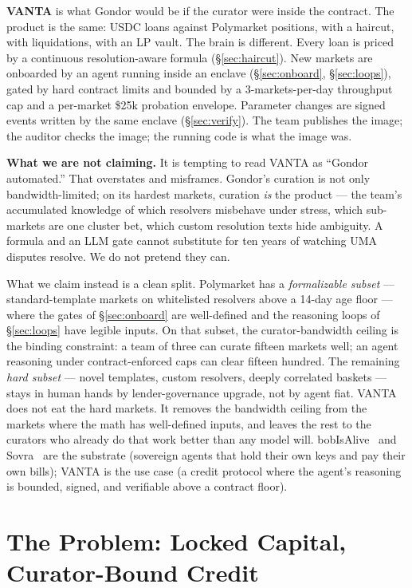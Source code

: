 \documentclass[11pt,letterpaper]{article}
\begin{document}
\textbf{VANTA} is what Gondor would be if the curator were inside the contract. The product is the same: USDC loans against Polymarket positions, with a haircut, with liquidations, with an LP vault. The brain is different. Every loan is priced by a continuous resolution-aware formula (\S\ref{sec:haircut}). New markets are onboarded by an agent running inside an enclave (\S\ref{sec:onboard}, \S\ref{sec:loops}), gated by hard contract limits and bounded by a 3-markets-per-day throughput cap and a per-market \$25k probation envelope. Parameter changes are signed events written by the same enclave (\S\ref{sec:verify}). The team publishes the image; the auditor checks the image; the running code is what the image was.

\textbf{What we are not claiming.} It is tempting to read VANTA as ``Gondor automated.'' That overstates and misframes. Gondor's curation is not only bandwidth-limited; on its hardest markets, curation \emph{is} the product --- the team's accumulated knowledge of which resolvers misbehave under stress, which sub-markets are one cluster bet, which custom resolution texts hide ambiguity. A formula and an LLM gate cannot substitute for ten years of watching UMA disputes resolve. We do not pretend they can.

What we claim instead is a clean split. Polymarket has a \emph{formalizable subset} --- standard-template markets on whitelisted resolvers above a 14-day age floor --- where the gates of \S\ref{sec:onboard} are well-defined and the reasoning loops of \S\ref{sec:loops} have legible inputs. On that subset, the curator-bandwidth ceiling is the binding constraint: a team of three can curate fifteen markets well; an agent reasoning under contract-enforced caps can clear fifteen hundred. The remaining \emph{hard subset} --- novel templates, custom resolvers, deeply correlated baskets --- stays in human hands by lender-governance upgrade, not by agent fiat. VANTA does not eat the hard markets. It removes the bandwidth ceiling from the markets where the math has well-defined inputs, and leaves the rest to the curators who already do that work better than any model will. bobIsAlive~\cite{bobisalive} and Sovra~\cite{sovra} are the substrate (sovereign agents that hold their own keys and pay their own bills); VANTA is the use case (a credit protocol where the agent's reasoning is bounded, signed, and verifiable above a contract floor).

\section{The Problem: Locked Capital, Curator-Bound Credit}
\label{sec:problem}
\end{document}
